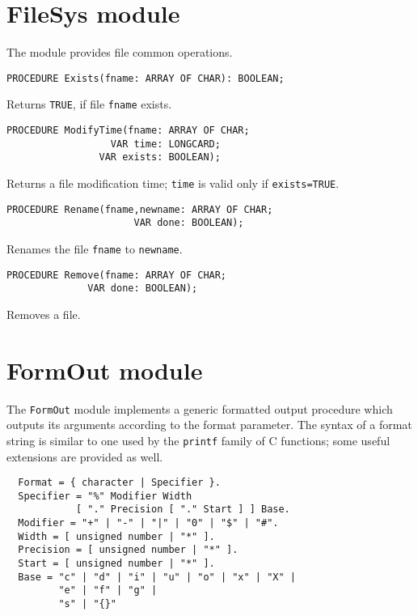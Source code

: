 
\section{FileSys module}
\renewcommand{\ModuleI}{FileSys}
\OneModule

The module provides file common operations.

{\samepage
{}
\begin{verbatim}
PROCEDURE Exists(fname: ARRAY OF CHAR): BOOLEAN;
\end{verbatim}
}
\ModuleList
Returns \verb'TRUE', if file {\tt fname} exists.

{\samepage
{}
\begin{verbatim}
PROCEDURE ModifyTime(fname: ARRAY OF CHAR;
                  VAR time: LONGCARD;
                VAR exists: BOOLEAN);
\end{verbatim}
}
\ModuleList
Returns a file modification time; {\tt time} is valid
only if \verb|exists=TRUE|.

{\samepage
{}
\begin{verbatim}
PROCEDURE Rename(fname,newname: ARRAY OF CHAR;
                      VAR done: BOOLEAN);
\end{verbatim}
}
\ModuleList
Renames the file {\tt fname} to {\tt newname}.

{\samepage
{}
\begin{verbatim}
PROCEDURE Remove(fname: ARRAY OF CHAR;
              VAR done: BOOLEAN);
\end{verbatim}
}
\ModuleList
Removes a file.


\section{FormOut module}
\renewcommand{\ModuleI}{FormOut}
\OneModule

The {\tt FormOut} module implements a generic formatted output
procedure which outputs its arguments according to the format parameter.
The syntax of a format string is similar to one used by
the {\tt printf} family of C functions;
some useful extensions are provided as well.

\begin{verbatim}
  Format = { character | Specifier }.
  Specifier = "%" Modifier Width
            [ "." Precision [ "." Start ] ] Base.
  Modifier = "+" | "-" | "|" | "0" | "$" | "#".
  Width = [ unsigned number | "*" ].
  Precision = [ unsigned number | "*" ].
  Start = [ unsigned number | "*" ].
  Base = "c" | "d" | "i" | "u" | "o" | "x" | "X" |
         "e" | "f" | "g" |
         "s" | "{}"
\end{verbatim}

